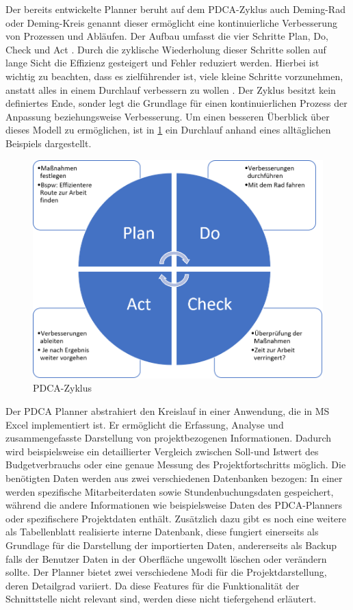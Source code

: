 \documentclass[11pt,a4paper]{report}
\begin{document}
Der bereits entwickelte Planner beruht auf dem PDCA-Zyklus auch Deming-Rad oder Deming-Kreis genannt dieser ermöglicht eine kontinuierliche Verbesserung von Prozessen und Abläufen. Der Aufbau umfasst die vier Schritte Plan, Do, Check und Act \cite{Syska}. Durch die zyklische Wiederholung dieser Schritte sollen auf lange Sicht die Effizienz gesteigert und Fehler reduziert werden. Hierbei ist wichtig zu beachten, dass es zielführender ist, viele kleine Schritte vorzunehmen, anstatt alles in einem Durchlauf verbessern zu wollen \cite{Syska}. Der Zyklus besitzt kein definiertes Ende, sonder legt die Grundlage für einen kontinuierlichen Prozess der Anpassung beziehungsweise Verbesserung. Um einen besseren Überblick über dieses Modell zu ermöglichen, ist in \ref{fig:PDCA-Zyklus} ein Durchlauf anhand eines alltäglichen Beispiels dargestellt.\newpage

\begin{figure}[h]
    \centering
    \includegraphics[width= \textwidth]{images/PDCA_Zyklus.png}
    \caption{PDCA-Zyklus}
    \label{fig:PDCA-Zyklus}
\end{figure}

\noindent
Der PDCA Planner abstrahiert den Kreislauf in einer Anwendung, die in MS Excel implementiert ist. Er ermöglicht die Erfassung, Analyse und zusammengefasste Darstellung von projektbezogenen Informationen. Dadurch wird beispielsweise ein detaillierter Vergleich zwischen Soll-und Istwert des Budgetverbrauchs oder eine genaue Messung des Projektfortschritts möglich. Die benötigten Daten werden aus zwei verschiedenen Datenbanken bezogen: In einer werden spezifische Mitarbeiterdaten sowie Stundenbuchungsdaten gespeichert, während die andere Informationen wie beispielsweise Daten des PDCA-Planners oder spezifischere Projektdaten enthält. Zusätzlich dazu gibt es noch eine weitere als Tabellenblatt realisierte interne Datenbank, diese fungiert einerseits als Grundlage für die Darstellung der importierten Daten, andererseits als Backup falls der Benutzer Daten in der Oberfläche ungewollt löschen oder verändern sollte. Der Planner bietet zwei verschiedene Modi für die Projektdarstellung, deren Detailgrad variiert. Da diese Features für die Funktionalität der Schnittstelle nicht relevant sind, werden diese nicht tiefergehend erläutert.
\end{document}
